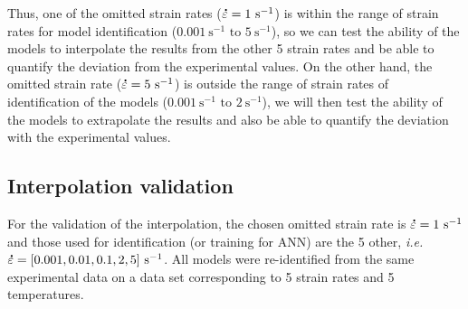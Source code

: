 \documentclass[twoside,english,1p,final,sort&compress]{elsarticle}
\makeatletter
\theoremstyle{plain}
\DeclareRobustCommand{\mdot}[1]{\accentset{\mbox{\bfseries .}}{#1}}
\DeclareRobustCommand{\ie}{\emph{i.e.}\@\xspace}
\DeclareRobustCommand{\ps}{\text{s}^{-1}}
\makeatother
\begin{document}
Thus, one of the omitted strain rates ($\mdot\varepsilon=1~\ps$) is within the range of strain rates for model identification ($0.001~\ps\text{ to }5~\ps$), so we can test the ability of the models to interpolate the results from the other 5 strain rates and be able to quantify the deviation from the experimental values.
On the other hand, the omitted strain rate ($\mdot\varepsilon=5~\ps$) is outside the range of strain rates of identification of the models ($0.001~\ps\text{ to }2~\ps$), we will then test the ability of the models to extrapolate the results and also be able to quantify the deviation with the experimental values.

\subsection{Interpolation validation}

For the validation of the interpolation, the chosen omitted strain rate is $\mdot\varepsilon=1~\ps$ and those used for identification (or training for ANN) are the 5 other, \ie $\mdot\varepsilon=[0.001, 0. 01, 0. 1, 2, 5]~\ps$.
All models were re-identified from the same experimental data on a data set corresponding to 5 strain rates and 5 temperatures.
\end{document}
